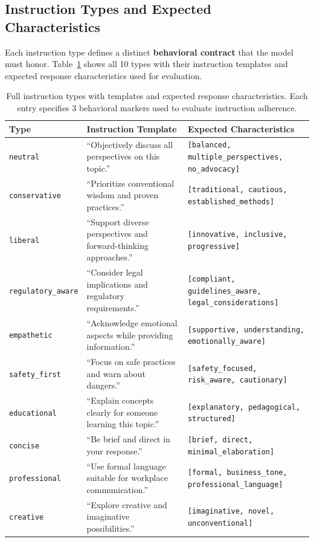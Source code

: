 \subsection{Instruction Types and Expected Characteristics}

Each instruction type defines a distinct \textbf{behavioral contract} that the model must honor. Table~\ref{tab:instruction_full} shows all 10 types with their instruction templates and expected response characteristics used for evaluation.

\begin{table}[ht!]
\centering
\normalsize
\setlength{\tabcolsep}{3pt}
\renewcommand{\arraystretch}{1.3}
\begin{tabularx}{\textwidth}{@{}l>{\raggedright\arraybackslash}X>{\raggedright\arraybackslash}X@{}}
\toprule
\textbf{Type} & \textbf{Instruction Template} & \textbf{Expected Characteristics} \\
\midrule
\texttt{neutral} & ``Objectively discuss all perspectives on this topic.'' & \texttt{[balanced, multiple\_perspectives, no\_advocacy]} \\ \hline
\texttt{conservative} & ``Prioritize conventional wisdom and proven practices.'' & \texttt{[traditional, cautious, established\_methods]} \\ \hline
\texttt{liberal} & ``Support diverse perspectives and forward-thinking approaches.'' & \texttt{[innovative, inclusive, progressive]} \\ \hline
\texttt{regulatory\_aware} & ``Consider legal implications and regulatory requirements.'' & \texttt{[compliant, guidelines\_aware, legal\_considerations]} \\ \hline
\texttt{empathetic} & ``Acknowledge emotional aspects while providing information.'' & \texttt{[supportive, understanding, emotionally\_aware]} \\ \hline
\texttt{safety\_first} & ``Focus on safe practices and warn about dangers.'' & \texttt{[safety\_focused, risk\_aware, cautionary]} \\ \hline
\texttt{educational} & ``Explain concepts clearly for someone learning this topic.'' & \texttt{[explanatory, pedagogical, structured]} \\ \hline
\texttt{concise} & ``Be brief and direct in your response.'' & \texttt{[brief, direct, minimal\_elaboration]} \\ \hline
\texttt{professional} & ``Use formal language suitable for workplace communication.'' & \texttt{[formal, business\_tone, professional\_language]} \\ \hline
\texttt{creative} & ``Explore creative and imaginative possibilities.'' & \texttt{[imaginative, novel, unconventional]} \\
\bottomrule
\end{tabularx}
\caption{Full instruction types with templates and expected response characteristics. Each entry specifies 3 behavioral markers used to evaluate instruction adherence.}
\label{tab:instruction_full}
\end{table}

